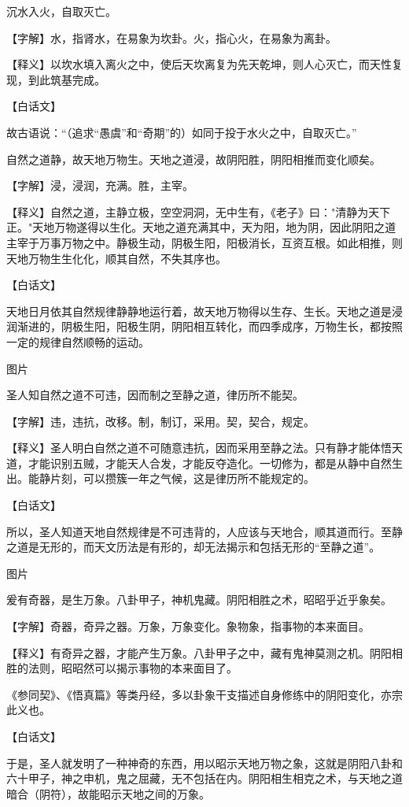 \documentclass[12pt,UTF8]{ctexbook}
\begin{document}
沉水入火，自取灭亡。


【字解】水，指肾水，在易象为坎卦。火，指心火，在易象为离卦。


【释义】以坎水填入离火之中，使后天坎离复为先天乾坤，则人心灭亡，而天性复现，到此筑基完成。


【白话文】


故古语说：“（追求“愚虞”和“奇期”的）如同于投于水火之中，自取灭亡。”


自然之道静，故天地万物生。天地之道浸，故阴阳胜，阴阳相推而变化顺矣。


【字解】浸，浸润，充满。胜，主宰。


【释义】自然之道，主静立极，空空洞洞，无中生有，《老子》曰："清静为天下正。"天地万物遂得以生化。天地之道充满其中，天为阳，地为阴，因此阴阳之道主宰于万事万物之中。静极生动，阴极生阳，阳极消长，互资互根。如此相推，则天地万物生生化化，顺其自然，不失其序也。


【白话文】


天地日月依其自然规律静静地运行着，故天地万物得以生存、生长。天地之道是浸润渐进的，阴极生阳，阳极生阴，阴阳相互转化，而四季成序，万物生长，都按照一定的规律自然顺畅的运动。

图片​


圣人知自然之道不可违，因而制之至静之道，律历所不能契。


【字解】违，违抗，改移。制，制订，采用。契，契合，规定。


【释义】圣人明白自然之道不可随意违抗，因而采用至静之法。只有静才能体悟天道，才能识别五贼，才能天人合发，才能反夺造化。一切修为，都是从静中自然生出。能静片刻，可以攒簇一年之气候，这是律历所不能规定的。


【白话文】


所以，圣人知道天地自然规律是不可违背的，人应该与天地合，顺其道而行。至静之道是无形的，而天文历法是有形的，却无法揭示和包括无形的“至静之道”。


图片​


爰有奇器，是生万象。八卦甲子，神机鬼藏。阴阳相胜之术，昭昭乎近乎象矣。


【字解】奇器，奇异之器。万象，万象变化。象物象，指事物的本来面目。



【释义】有奇异之器，才能产生万象。八卦甲子之中，藏有鬼神莫测之机。阴阳相胜的法则，昭昭然可以揭示事物的本来面目了。


《参同契》、《悟真篇》等类丹经，多以卦象干支描述自身修练中的阴阳变化，亦宗此义也。


【白话文】


于是，圣人就发明了一种神奇的东西，用以昭示天地万物之象，这就是阴阳八卦和六十甲子，神之申机，鬼之屈藏，无不包括在内。阴阳相生相克之术，与天地之道暗合（阴符），故能昭示天地之间的万象。
\end{document}
